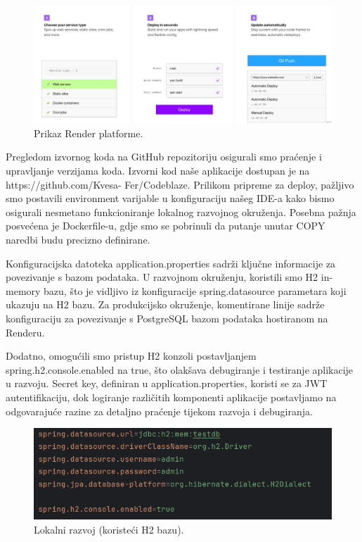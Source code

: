 		\begin{figure} [H]
			\centering
			\includegraphics[width=0.7\linewidth]{slike/render.png}
			\caption{Prikaz Render platforme.}
			\label{fig:Prikaz Render platforme.}
		\end{figure}

		Pregledom izvornog koda na GitHub repozitoriju osigurali smo praćenje i upravljanje verzijama koda. Izvorni kod naše aplikacije dostupan je na https://github.com/Kvesa- Fer/Codeblaze. Prilikom pripreme za deploy, pažljivo smo postavili environment varijable u konfiguraciju našeg IDE-a kako bismo osigurali nesmetano funkcioniranje lokalnog razvojnog okruženja. Posebna pažnja posvećena je Dockerfile-u, gdje smo se pobrinuli da putanje unutar COPY naredbi budu precizno definirane.

		Konfiguracijska datoteka application.properties sadrži ključne informacije za povezivanje s bazom podataka. U razvojnom okruženju, koristili smo H2 in-memory bazu, što je vidljivo iz konfiguracije spring.datasource parametara koji ukazuju na H2 bazu. Za produkcijsko okruženje, komentirane linije sadrže konfiguraciju za povezivanje s PostgreSQL bazom podataka hostiranom na Renderu.

		Dodatno, omogućili smo pristup H2 konzoli postavljanjem spring.h2.console.enabled na true, što olakšava debugiranje i testiranje aplikacije u razvoju. Secret key, definiran u application.properties, koristi se za JWT autentifikaciju, dok logiranje različitih komponenti aplikacije postavljamo na odgovarajuće razine za detaljno praćenje tijekom razvoja i debugiranja.

		\begin{figure} [H]
			\centering
			\includegraphics[width=0.7\linewidth]{slike/ap.png}
			\caption{Lokalni razvoj (koristeći H2 bazu).}
			\label{fig:Lokalni razvoj (koristeći H2 bazu).}
		\end{figure}

